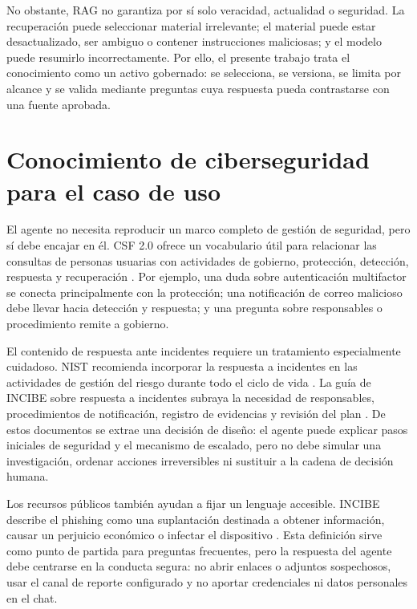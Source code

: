 No obstante, RAG no garantiza por sí solo veracidad, actualidad o seguridad. La
recuperación puede seleccionar material irrelevante; el material puede estar
desactualizado, ser ambiguo o contener instrucciones maliciosas; y el modelo
puede resumirlo incorrectamente. Por ello, el presente trabajo trata el
conocimiento como un activo gobernado: se selecciona, se versiona, se limita por
alcance y se valida mediante preguntas cuya respuesta pueda contrastarse con una
fuente aprobada.

\section{Conocimiento de ciberseguridad para el caso de uso}
\label{sec:conocimiento-ciberseguridad}

El agente no necesita reproducir un marco completo de gestión de seguridad, pero
sí debe encajar en él. CSF 2.0 ofrece un vocabulario útil para relacionar las
consultas de personas usuarias con actividades de gobierno, protección,
detección, respuesta y recuperación \cite{nistCsf2024}. Por ejemplo, una duda
sobre autenticación multifactor se conecta principalmente con la protección; una
notificación de correo malicioso debe llevar hacia detección y respuesta; y una
pregunta sobre responsables o procedimiento remite a gobierno.

El contenido de respuesta ante incidentes requiere un tratamiento especialmente
cuidadoso. NIST recomienda incorporar la respuesta a incidentes en las
actividades de gestión del riesgo durante todo el ciclo de vida
\cite{nistIncident2025}. La guía de INCIBE sobre respuesta a incidentes subraya
la necesidad de responsables, procedimientos de notificación, registro de
evidencias y revisión del plan \cite{incibeCrisis}. De estos documentos se
extrae una decisión de diseño: el agente puede explicar pasos iniciales de
seguridad y el mecanismo de escalado, pero no debe simular una investigación,
ordenar acciones irreversibles ni sustituir a la cadena de decisión humana.

Los recursos públicos también ayudan a fijar un lenguaje accesible. INCIBE
describe el phishing como una suplantación destinada a obtener información,
causar un perjuicio económico o infectar el dispositivo \cite{incibePhishing}.
Esta definición sirve como punto de partida para preguntas frecuentes, pero la
respuesta del agente debe centrarse en la conducta segura: no abrir enlaces o
adjuntos sospechosos, usar el canal de reporte configurado y no aportar
credenciales ni datos personales en el chat.


